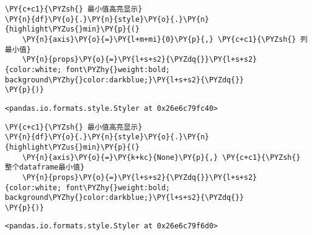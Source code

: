     \begin{tcolorbox}[breakable, size=fbox, boxrule=1pt, pad at break*=1mm,colback=cellbackground, colframe=cellborder]
\begin{Verbatim}[commandchars=\\\{\}]
\PY{c+c1}{\PYZsh{} 最小值高亮显示}
\PY{n}{df}\PY{o}{.}\PY{n}{style}\PY{o}{.}\PY{n}{highlight\PYZus{}min}\PY{p}{(}
    \PY{n}{axis}\PY{o}{=}\PY{l+m+mi}{0}\PY{p}{,} \PY{c+c1}{\PYZsh{} 列最小值}
    \PY{n}{props}\PY{o}{=}\PY{l+s+s2}{\PYZdq{}}\PY{l+s+s2}{color:white; font\PYZhy{}weight:bold; background\PYZhy{}color:darkblue;}\PY{l+s+s2}{\PYZdq{}}
\PY{p}{)}
\end{Verbatim}
\end{tcolorbox}

            \begin{tcolorbox}[breakable, size=fbox, boxrule=.5pt, pad at break*=1mm, opacityfill=0]
\begin{Verbatim}[commandchars=\\\{\}]
<pandas.io.formats.style.Styler at 0x26e6c79fc40>
\end{Verbatim}
\end{tcolorbox}
        
    \begin{tcolorbox}[breakable, size=fbox, boxrule=1pt, pad at break*=1mm,colback=cellbackground, colframe=cellborder]
\begin{Verbatim}[commandchars=\\\{\}]
\PY{c+c1}{\PYZsh{} 最小值高亮显示}
\PY{n}{df}\PY{o}{.}\PY{n}{style}\PY{o}{.}\PY{n}{highlight\PYZus{}min}\PY{p}{(}
    \PY{n}{axis}\PY{o}{=}\PY{k+kc}{None}\PY{p}{,} \PY{c+c1}{\PYZsh{} 整个dataframe最小值}
    \PY{n}{props}\PY{o}{=}\PY{l+s+s2}{\PYZdq{}}\PY{l+s+s2}{color:white; font\PYZhy{}weight:bold; background\PYZhy{}color:darkblue;}\PY{l+s+s2}{\PYZdq{}}
\PY{p}{)}
\end{Verbatim}
\end{tcolorbox}

            \begin{tcolorbox}[breakable, size=fbox, boxrule=.5pt, pad at break*=1mm, opacityfill=0]
\begin{Verbatim}[commandchars=\\\{\}]
<pandas.io.formats.style.Styler at 0x26e6c79f6d0>
\end{Verbatim}
\end{tcolorbox}
